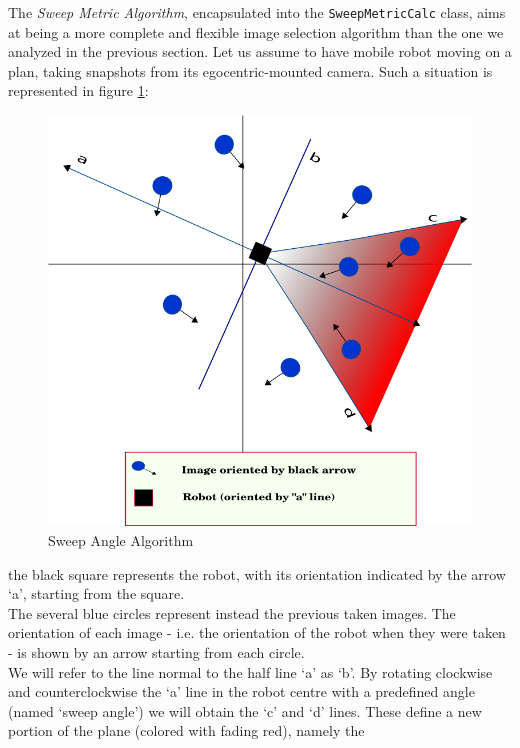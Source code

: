 The  \textit{Sweep Metric Algorithm}, encapsulated into the 
\texttt{SweepMetricCalc} class, aims at being a more 
complete and flexible image selection algorithm than the one 
we analyzed in the previous section.
Let us assume to have  mobile robot moving on a plan, 
taking snapshots from its egocentric-mounted camera.
Such a situation is represented in figure 
\ref{fig:half_plan_finding}:
\begin{figure}[!h]
  \begin{center}
    \includegraphics[width=400pt]{img/half_plan_finding.png} 
    \caption{Sweep Angle Algorithm}
    \label{fig:half_plan_finding}
  \end{center}
\end{figure}
the black square represents the robot, with its orientation 
indicated by the arrow `a', starting from the square.
\\
The several blue circles represent instead the previous 
taken images. The orientation of each image - i.e. the 
orientation of the robot when they were taken - 
is shown by an arrow starting from each circle.
\\
We will refer to the line normal to the half line `a' as `b'. 
By rotating clockwise and counterclockwise the `a' line in 
the robot centre with a predefined angle (named `sweep angle')
we will obtain the `c' and `d' lines. These define a new 
portion of the plane (colored with fading red), namely the 
